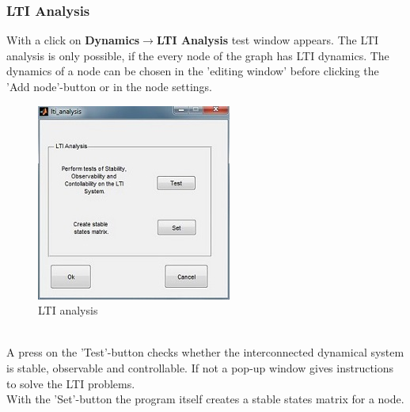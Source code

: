 \documentclass[12pt]{report}
\begin{document}
\subsubsection{LTI Analysis}
With a click on \textbf{Dynamics$\rightarrow$LTI Analysis} test window appears. The LTI analysis is only possible, if the every node of the graph has LTI dynamics. The dynamics of a node can be chosen in the 'editing window' before clicking the 'Add node'-button or in the node settings.\\
\begin{figure}[h]
\centering
\includegraphics[scale=.75]{ltiana}
\caption{LTI analysis}
\label{FIG:abb19}
\end{figure}
\\
A press on the 'Test'-button checks whether the interconnected dynamical system is stable, observable and controllable. If not a pop-up window gives instructions to solve the LTI problems.\\
With the 'Set'-button the program itself creates a stable states matrix for a node.\\
\\
\end{document}
